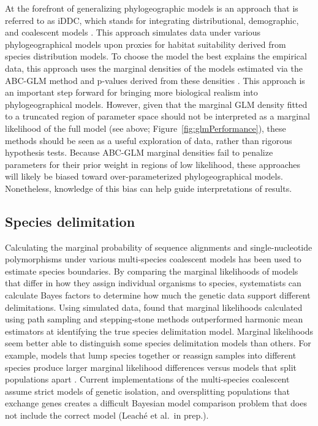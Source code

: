 At the forefront of generalizing phylogeographic models is an approach that is
referred to as iDDC, which stands for integrating distributional, demographic,
and coalescent models \citep{Papadopoulou2016}.
This approach simulates data under various phylogeographical models upon
proxies for habitat suitability derived from species distribution models.
To choose the model the best explains the empirical data, this approach uses
the marginal densities of the models estimated via the ABC-GLM method and
p-values derived from these densities
\citep{He2013}
\citep{Massatti2016}
\citep{Bemmels2016}
\citep{Knowles2017}
\citep{Papadopoulou2016}.
This approach is an important step forward for bringing more biological realism
into phylogeographical models.
However, given that the marginal GLM density fitted to a truncated region of
parameter space should not be interpreted as a marginal likelihood of the full
model (see above; Figure~\ref{fig:glmPerformance}), these methods should be
seen as a useful exploration of data, rather than rigorous hypothesis tests.
Because ABC-GLM marginal densities fail to penalize parameters for their
prior weight in regions of low likelihood, these approaches will likely
be biased toward over-parameterized phylogeographical models.
Nonetheless, knowledge of this bias can help guide interpretations of results.


\subsection{Species delimitation}
Calculating the marginal probability of sequence alignments \citep{Grummer2013}
and single-nucleotide polymorphisms \citep{Leache2014} under various
multi-species coalescent models has been used to estimate species boundaries.
By comparing the marginal likelihoods of models that differ in how they assign
individual organisms to species, systematists can calculate Bayes factors to
determine how much the genetic data support different delimitations.
Using simulated data, \citep{Grummer2013} found that marginal likelihoods
calculated using path sampling and stepping-stone methods outperformed harmonic
mean estimators at identifying the true species delimitation model.
Marginal likelihoods seem better able to distinguish some species delimitation
models than others.
For example, models that lump species together or reassign samples into
different species produce larger marginal likelihood differences versus models
that split populations apart \citep{Grummer2013, Leache2014}.
Current implementations of the multi-species coalescent assume strict models of
genetic isolation, and oversplitting populations that exchange genes creates a
difficult Bayesian model comparison problem that does not include the correct
model (Leach\'{e} et al.\ in prep.). 

